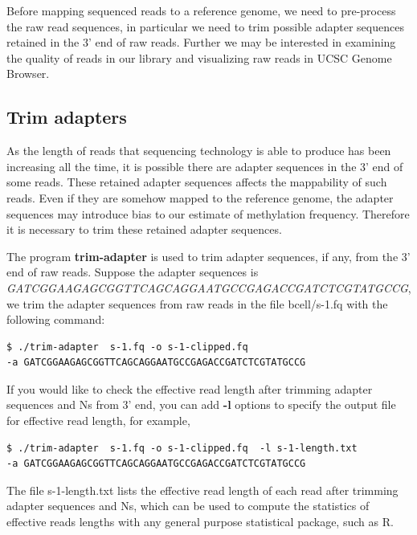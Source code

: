 \documentclass{article}
\begin{document}
Before mapping sequenced reads to a reference genome, we need to
pre-process the raw read sequences, in particular we need to trim
possible adapter sequences retained in the 3' end of raw
reads. Further we may be interested in examining the quality of reads
in our library and visualizing raw reads in UCSC Genome Browser. 

\subsection{Trim adapters}
\label{sec:trim-adapter}
As the length of reads that sequencing technology is able to produce
has been increasing all the time, it is possible there are adapter
sequences in the 3' end of some reads. These retained adapter
sequences affects the mappability of such reads. Even if they are
somehow mapped to the reference genome, the adapter sequences may
introduce bias to our estimate of methylation frequency. Therefore it
is necessary to trim these retained adapter sequences. 

The program \textbf{trim-adapter} is used to trim adapter sequences,
if any, from the 3' end of raw reads. Suppose the adapter sequences is
\textit{GATCGGAAGAGCGGTTCAGCAGGAATGCCGAGACCGATCTCGTATGCCG}, we trim
the adapter sequences from raw reads in the file bcell/s-1.fq with the
following command:
\begin{verbatim}
$ ./trim-adapter  s-1.fq -o s-1-clipped.fq  
-a GATCGGAAGAGCGGTTCAGCAGGAATGCCGAGACCGATCTCGTATGCCG  
\end{verbatim}

If you would like to check the effective read length after trimming
adapter sequences and Ns from 3' end, you can add \textbf{-l} options
to specify the output file for effective read length, for example,
\begin{verbatim}
$ ./trim-adapter  s-1.fq -o s-1-clipped.fq  -l s-1-length.txt
-a GATCGGAAGAGCGGTTCAGCAGGAATGCCGAGACCGATCTCGTATGCCG  
\end{verbatim}
The file s-1-length.txt lists the effective read length of each read
after trimming adapter sequences and Ns, which can be used to compute
the statistics of effective reads lengths with any general purpose
statistical package, such as R.  
\end{document}
